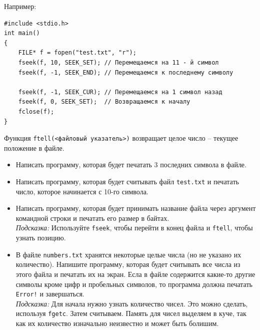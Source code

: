 \documentclass{article}
\begin{document}
Например:
\begin{lstlisting}
#include <stdio.h>
int main()
{
    FILE* f = fopen("test.txt", "r");
    fseek(f, 10, SEEK_SET); // Перемещаемся на 11 - й символ
    fseek(f, -1, SEEK_END); // Перемещаемся к последнему символу
	
    fseek(f, -1, SEEK_CUR); // Перемещаемся на 1 символ назад
    fseek(f, 0, SEEK_SET);  // Возвращаемся к началу
    fclose(f);
}

\end{lstlisting}

Функция \texttt{ftell(<файловый указатель>)} возвращает целое число -- текущее положение в файле.

\begin{itemize}
\item Написать программу, которая будет печатать 3 последних символа в файле.\\
\item Написать программу, которая будет считывать файл \texttt{test.txt} и печатать число, которое начинается с 10-го символа.
\item Написать программу, которая будет принимать название файла через аргумент командной строки и печатать его размер в байтах.\\
\textit{Подсказка:} Используйте \texttt{fseek}, чтобы перейти в конец файла и \texttt{ftell}, чтобы узнать позицию.

\item В файле \texttt{numbers.txt} хранятся некоторые целые числа (но не указано их количество). Напишите программу, которая будет считывать все числа из этого файла и печатать их на экран. Есла в файле содержится какие-то другие символы кроме цифр и пробельных символов, то программа должна печатать \texttt{Error!} и завершаться.\\
\textit{Подсказка:} Для начала нужно узнать количество чисел. Это можно сделать, используя \texttt{fgetc}. Затем считываем. Память для чисел выделяем в куче, так как их количество изначально неизвестно и может быть болишим.
\end{itemize}
\end{document}
